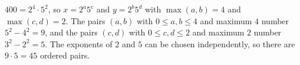 $400=2^4\cdot5^2$, so $x=2^{a}5^{c}$ and $y=2^{b}5^{d}$ with $\max(a,b)=4$ and $\max(c,d)=2$. The pairs $(a,b)$ with $0\le a,b\le4$ and maximum $4$ number $5^2-4^2=9$, and the pairs $(c,d)$ with $0\le c,d\le2$ and maximum $2$ number $3^2-2^2=5$. The exponents of $2$ and $5$ can be chosen independently, so there are $9\cdot5=\boxed{45}$ ordered pairs.
